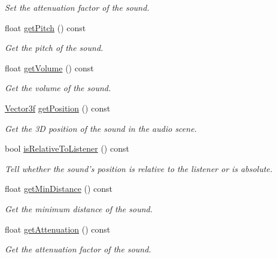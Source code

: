 \begin{DoxyCompactItemize}
\begin{DoxyCompactList}\small\item\em Set the attenuation factor of the sound. \end{DoxyCompactList}\item 
float \hyperlink{classsf_1_1SoundSource_aedad6aff442aeb6dcd267befd4fdbb59}{get\-Pitch} () const 
\begin{DoxyCompactList}\small\item\em Get the pitch of the sound. \end{DoxyCompactList}\item 
float \hyperlink{classsf_1_1SoundSource_aafb0558fce9cbebfc6828d932cbcce2f}{get\-Volume} () const 
\begin{DoxyCompactList}\small\item\em Get the volume of the sound. \end{DoxyCompactList}\item 
\hyperlink{classsf_1_1Vector3}{Vector3f} \hyperlink{classsf_1_1SoundSource_a4c3bc60286f488aaf2941ab76476eebc}{get\-Position} () const 
\begin{DoxyCompactList}\small\item\em Get the 3\-D position of the sound in the audio scene. \end{DoxyCompactList}\item 
bool \hyperlink{classsf_1_1SoundSource_a5cb9107e1c47f65ab82c4885436061ef}{is\-Relative\-To\-Listener} () const 
\begin{DoxyCompactList}\small\item\em Tell whether the sound's position is relative to the listener or is absolute. \end{DoxyCompactList}\item 
float \hyperlink{classsf_1_1SoundSource_a3379b9f7a0f0e31ab9a4e5fa1762986e}{get\-Min\-Distance} () const 
\begin{DoxyCompactList}\small\item\em Get the minimum distance of the sound. \end{DoxyCompactList}\item 
float \hyperlink{classsf_1_1SoundSource_ac5f5ffef8930bb573f43d47cbc779bf6}{get\-Attenuation} () const 
\begin{DoxyCompactList}\small\item\em Get the attenuation factor of the sound. \end{DoxyCompactList}\end{DoxyCompactItemize}
